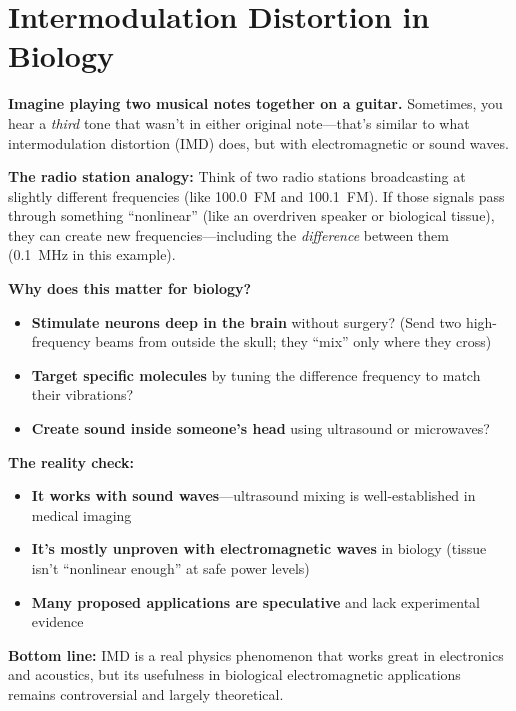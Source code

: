 \chapter{Intermodulation Distortion in Biology}
\label{ch:imd-biology}

\begin{nontechnical}
\textbf{Imagine playing two musical notes together on a guitar.} Sometimes, you hear a \emph{third} tone that wasn't in either original note---that's similar to what intermodulation distortion (IMD) does, but with electromagnetic or sound waves.

\textbf{The radio station analogy:} Think of two radio stations broadcasting at slightly different frequencies (like 100.0~FM and 100.1~FM). If those signals pass through something ``nonlinear'' (like an overdriven speaker or biological tissue), they can create new frequencies---including the \emph{difference} between them (0.1~MHz in this example).

\textbf{Why does this matter for biology?}
\begin{itemize}
\item \textbf{Stimulate neurons deep in the brain} without surgery? (Send two high-frequency beams from outside the skull; they ``mix'' only where they cross)
\item \textbf{Target specific molecules} by tuning the difference frequency to match their vibrations?
\item \textbf{Create sound inside someone's head} using ultrasound or microwaves?
\end{itemize}

\textbf{The reality check:}
\begin{itemize}
\item[\checkmark] \textbf{It works with sound waves}---ultrasound mixing is well-established in medical imaging
\item[\texttimes] \textbf{It's mostly unproven with electromagnetic waves} in biology (tissue isn't ``nonlinear enough'' at safe power levels)
\item[\texttimes] \textbf{Many proposed applications are speculative} and lack experimental evidence
\end{itemize}

\textbf{Bottom line:} IMD is a real physics phenomenon that works great in electronics and acoustics, but its usefulness in biological electromagnetic applications remains controversial and largely theoretical.
\end{nontechnical}

